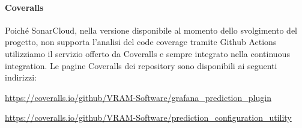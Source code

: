 	\paragraph{Coveralls}
	Poiché SonarCloud, nella versione disponibile al momento dello svolgimento del progetto\glo, non supporta l'analisi del code coverage tramite Github Actions utilizziamo il servizio offerto da Coveralls e sempre integrato nella continuous integration. Le pagine Coveralls dei repository sono disponibili ai seguenti indirizzi:
	\begin{center}
		\url{https://coveralls.io/github/VRAM-Software/grafana_prediction_plugin}
	\end{center}
	\begin{center}
	\url{https://coveralls.io/github/VRAM-Software/prediction_configuration_utility}
	\end{center}
	
		